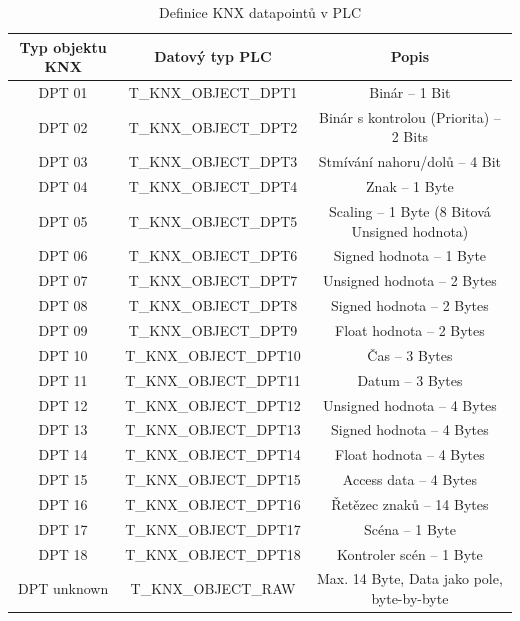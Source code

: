 \begin{table}[h]
    \caption[Definice KNX datapointů v PLC]{Definice KNX datapointů v PLC}
        \small
            \centering
            \begin{tabular}{|c|c|c|}
                \hline
                Typ objektu KNX & Datový typ PLC & Popis  \\
                \hline\hline
                DPT 01 & T\_KNX\_OBJECT\_DPT1 & Binár -- 1 Bit \\
                \hline
                DPT 02 & T\_KNX\_OBJECT\_DPT2 & Binár s kontrolou (Priorita) -- 2 Bits \\
                \hline
                DPT 03 & T\_KNX\_OBJECT\_DPT3 & Stmívání nahoru/dolů -- 4 Bit \\
                \hline
                DPT 04 & T\_KNX\_OBJECT\_DPT4 & Znak -- 1 Byte \\
                \hline
                DPT 05 & T\_KNX\_OBJECT\_DPT5 & Scaling -- 1 Byte (8 Bitová Unsigned hodnota) \\
                \hline
                DPT 06 & T\_KNX\_OBJECT\_DPT6 & Signed hodnota -- 1 Byte \\
                \hline
                DPT 07 & T\_KNX\_OBJECT\_DPT7 & Unsigned hodnota -- 2 Bytes \\
                \hline
                DPT 08 & T\_KNX\_OBJECT\_DPT8 & Signed hodnota -- 2 Bytes \\
                \hline
                DPT 09 & T\_KNX\_OBJECT\_DPT9 & Float hodnota -- 2 Bytes \\
                \hline
                DPT 10 & T\_KNX\_OBJECT\_DPT10 & Čas -- 3 Bytes \\
                \hline
                DPT 11 & T\_KNX\_OBJECT\_DPT11 & Datum -- 3 Bytes \\
                \hline
                DPT 12 & T\_KNX\_OBJECT\_DPT12 & Unsigned hodnota -- 4 Bytes \\
                \hline
                DPT 13 & T\_KNX\_OBJECT\_DPT13 & Signed hodnota -- 4 Bytes \\
                \hline
                DPT 14 & T\_KNX\_OBJECT\_DPT14 & Float hodnota -- 4 Bytes \\
                \hline
                DPT 15 & T\_KNX\_OBJECT\_DPT15 & Access data -- 4 Bytes \\
                \hline
                DPT 16 & T\_KNX\_OBJECT\_DPT16 & Řetězec znaků -- 14 Bytes \\
                \hline
                DPT 17 & T\_KNX\_OBJECT\_DPT17 & Scéna -- 1 Byte \\
                \hline
                DPT 18 & T\_KNX\_OBJECT\_DPT18 & Kontroler scén -- 1 Byte \\
                \hline
                DPT unknown & T\_KNX\_OBJECT\_RAW & Max. 14 Byte, Data jako pole, byte-by-byte \\
                \hline
            \end{tabular}
\end{table}
